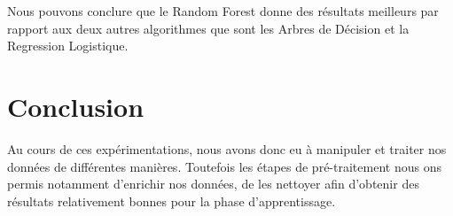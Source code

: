 Nous pouvons conclure que le Random Forest donne des résultats meilleurs par rapport aux deux autres algorithmes que sont les Arbres de Décision et la Regression Logistique.


\section{Conclusion}
Au cours de ces expérimentations, nous avons donc eu à manipuler et traiter nos données de différentes manières. Toutefois les étapes de pré-traitement nous ons permis notamment d'enrichir nos données, de les nettoyer afin d'obtenir des résultats relativement bonnes pour la phase d'apprentissage.
